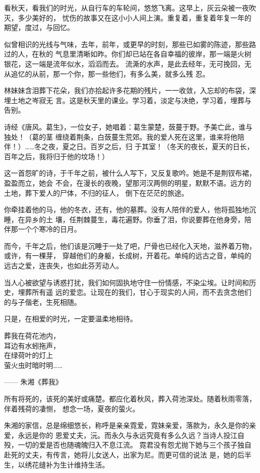 		看秋天，看我们的时光，从自行车的车轮间，悠悠飞离。这早上，灰云朵被一夜吹灭，多少美好的，
	忧伤的故事又在这小小人间上演。重复着，重复着年复一年的期望，度过，与回忆。

		似曾相识的光线与气味，去年，前年，或更早的时刻，那些已如雾的陈迹，那些路过的人，在秋的
	气息里清晰如昨。你们却已站在各自幸福的彼岸，那一端是火树银花，这一端是流年似水，滔滔而去。
	流澌的水声，是此去经年，无可挽回，无从追忆的从前，那一个你，那一些他们，有多么美，就多么残
	忍。

		林妹妹含泪葬下花朵，我们亦拾起许多花期的残片，一一收敛，入忘却的布袋，深埋土地之岑寂无
	言。这是秋天里的课业。学习着，淡定与决绝，学习着，埋葬与告别。

		诗经《唐风。葛生》，一位女子，她唱着：葛生蒙楚，蔹蔓于野。予美亡此，谁与独处！（葛的茎
	缠绕着荆条，白蔹蔓生荒郊。我的爱人死在这里，谁来将他陪伴！）……冬之夜，夏之日。百岁之后，归
	于其室！（冬天的夜长，夏天的日长，百年之后，我将归于他的坟场！）

		这一首怨旷的诗，于千年之前，被什么人写下，又反复歌吟。她是不是荆钗布裙，盈盈而立，她会
	不会，在漫长的夜晚，望那河汉两侧的明星，默默不语。远方的土地，葬下爱人的尸体，不归的征人，
	倒下在茫茫的旅途。

		你牵挂着他的马，他的冬衣，还有，他的墓葬。没有人陪伴的爱人，他将孤独地沉睡，在异乡的土
	壤，任荆棘蔓生，毒花遍野。你垂了泪，你说要葬在他身旁，陪伴那一个个寒冷的日月。

		而今，千年之后，他们该是沉睡于一处了吧，尸骨也已经化入天地，滋养着万物，或许，有一棵芽，
	穿越他们的身躯，长成树，开着花。单纯的远古之音，单纯的远古之爱，连丧失，也如此芬芳动人。

		当人心被欲望与诱惑打扰，我们如何固执地守住一份情感，不染尘埃。让时间和历史，埋葬所有遥
	远的爱恋。让现在的我们，甘心于现实的人间，而不去贪念他们的与子偕老，生死相随。

		只是，在相爱的时光，一定要温柔地相待。

		\longpoem{}{}{}

			葬我在荷花池内，\\
			耳边有水蚓拖声，\\
			在绿荷叶的灯上 \\
			萤火虫时暗时明……

			\hspace{4em} —— 朱湘《葬我》
		\endlongpoem


		所有将死的，该死的美好或痛楚。都应化着秋风，葬入荷池深处。随着秋雨零落，伴着残荷的凄恻，
	想念一场，夏夜的萤火。

		朱湘的家信，总是绵细悠长，称呼是亲亲霓爱，霓妹亲爱，落款为，永久是你的亲爱，永远是你的
	恩爱丈夫，沅。而永久与永远究竟有多么久远？当诗人投江自殁，一切的爱是否也随魂魄归入不息江流。
	霓君没有怨尤抛下她与三个孩子独自赴死的丈夫，有传言，她将儿女送人，出家为尼。而更可信的说法
	是，她的后半生，以绣花缝补为生计维持生活。


